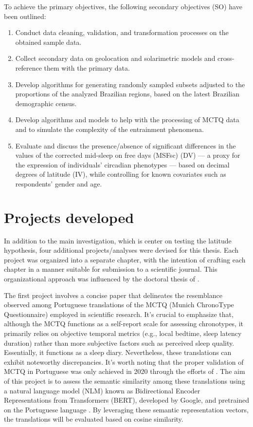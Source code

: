 \documentclass[
12pt,
openright,
oneside,
a4paper,
chapter=TITLE,
section=TITLE,
french,
spanish,
brazil,
english
]{abntex2}\usepackage{array}
\newcommand{\microskip}{\vspace{\microskipamount}}
\begin{document}
\microskip

To achieve the primary objectives, the following secondary objectives
(SO) have been outlined:

\microskip

\begin{enumerate}
\def\labelenumi{\roman{enumi})}
\item
  Conduct data cleaning, validation, and transformation processes on the
  obtained sample data.
\item
  Collect secondary data on geolocation and solarimetric models and
  cross-reference them with the primary data.
\item
  Develop algorithms for generating randomly sampled subsets adjusted to
  the proportions of the analyzed Brazilian regions, based on the latest
  Brazilian demographic census.
\item
  Develop algorithms and models to help with the processing of MCTQ data
  and to simulate the complexity of the entrainment phenomena.
\item
  Evaluate and discuss the presence/absence of significant differences
  in the values of the corrected mid-sleep on free days (MSFsc) (DV) ---
  a proxy for the expression of individuals' circadian phenotypes ---
  based on decimal degrees of latitude (IV), while controlling for known
  covariates such as respondents' gender and age.
\end{enumerate}

\section{Projects developed}\label{projects-developed}

In addition to the main investigation, which is center on testing the
latitude hypothesis, four additional projects/analyses were devised for
this thesis. Each project was organized into a separate chapter, with
the intention of crafting each chapter in a manner suitable for
submission to a scientific journal. This organizational approach was
influenced by the doctoral thesis of \textcite{reis2020}.

The first project involves a concise paper that delineates the
resemblance observed among Portuguese translations of the MCTQ (Munich
ChronoType Questionnaire) employed in scientific research. It's crucial
to emphasize that, although the MCTQ functions as a self-report scale
for assessing chronotypes, it primarily relies on objective temporal
metrics (e.g., local bedtime, sleep latency duration) rather than more
subjective factors such as perceived sleep quality. Essentially, it
functions as a sleep diary. Nevertheless, these translations can exhibit
noteworthy discrepancies. It's worth noting that the proper validation
of MCTQ in Portuguese was only achieved in 2020 through the efforts of
\textcite{reis2020}. The aim of this project is to assess the semantic
similarity among these translations using a natural language model (NLM)
known as Bidirectional Encoder Representations from Transformers (BERT),
developed by Google, and pretrained on the Portuguese language
\autocite{devlin2018,souza2020}. By leveraging these semantic
representation vectors, the translations will be evaluated based on
cosine similarity.
\end{document}
